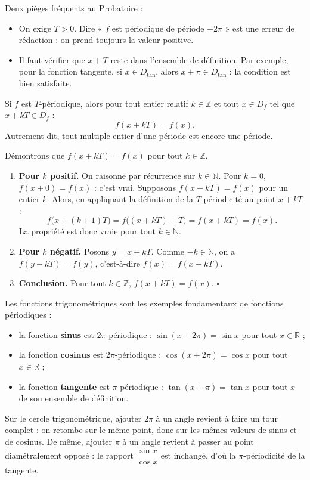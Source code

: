 \documentclass[11pt]{article}
\begin{document}
\begin{attention}
Deux pièges fréquents au Probatoire :
\begin{itemize}
\item On exige $T>0$. Dire « $f$ est périodique de période $-2\pi$ » est une erreur de rédaction : on prend toujours la valeur positive.
\item Il faut vérifier que $x+T$ reste dans l'ensemble de définition. Par exemple, pour la fonction tangente, si $x\in D_{\tan}$, alors $x+\pi\in D_{\tan}$ : la condition est bien satisfaite.
\end{itemize}
\end{attention}

\begin{propriete}
Si $f$ est $T$-périodique, alors pour tout entier relatif $k\in\mathbb{Z}$ et tout $x\in D_f$ tel que $x+kT\in D_f$ :
\[ f(x+kT)=f(x). \]
Autrement dit, tout multiple entier d'une période est encore une période.
\end{propriete}

\begin{experience}
Démontrons que $f(x+kT)=f(x)$ pour tout $k\in\mathbb{Z}$.
\begin{enumerate}
\item \textbf{Pour $k$ positif.} On raisonne par récurrence sur $k\in\mathbb{N}$. Pour $k=0$, $f(x+0)=f(x)$ : c'est vrai. Supposons $f(x+kT)=f(x)$ pour un entier $k$. Alors, en appliquant la définition de la $T$-périodicité au point $x+kT$ :
\[ f\bigl(x+(k+1)T\bigr)=f\bigl((x+kT)+T\bigr)=f(x+kT)=f(x). \]
La propriété est donc vraie pour tout $k\in\mathbb{N}$.
\item \textbf{Pour $k$ négatif.} Posons $y=x+kT$. Comme $-k\in\mathbb{N}$, on a $f(y-kT)=f(y)$, c'est-à-dire $f(x)=f(x+kT)$.
\item \textbf{Conclusion.} Pour tout $k\in\mathbb{Z}$, $f(x+kT)=f(x)$. $\square$
\end{enumerate}
\end{experience}

\begin{exemplebox}
Les fonctions trigonométriques sont les exemples fondamentaux de fonctions périodiques :
\begin{itemize}
\item la fonction \textbf{sinus} est $2\pi$-périodique : $\sin(x+2\pi)=\sin x$ pour tout $x\in\mathbb{R}$ ;
\item la fonction \textbf{cosinus} est $2\pi$-périodique : $\cos(x+2\pi)=\cos x$ pour tout $x\in\mathbb{R}$ ;
\item la fonction \textbf{tangente} est $\pi$-périodique : $\tan(x+\pi)=\tan x$ pour tout $x$ de son ensemble de définition.
\end{itemize}
Sur le cercle trigonométrique, ajouter $2\pi$ à un angle revient à faire un tour complet : on retombe sur le même point, donc sur les mêmes valeurs de sinus et de cosinus. De même, ajouter $\pi$ à un angle revient à passer au point diamétralement opposé : le rapport $\dfrac{\sin x}{\cos x}$ est inchangé, d'où la $\pi$-périodicité de la tangente.
\end{exemplebox}
\end{document}
